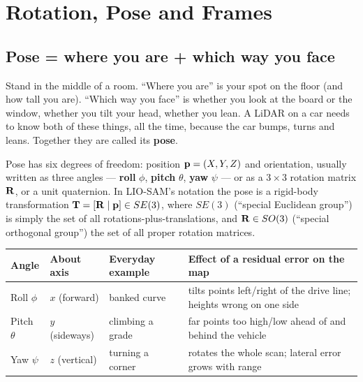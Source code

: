 \chapter{Rotation, Pose and Frames}

\section{Pose = where you are + which way you face}
\begin{kid}
Stand in the middle of a room. ``Where you are'' is your spot on the floor (and how tall you are). ``Which way you face'' is whether you look at the board or the window, whether you tilt your head, whether you lean. A LiDAR on a car needs to know both of these things, all the time, because the car bumps, turns and leans. Together they are called its \textbf{pose}.
\end{kid}

\begin{eng}
Pose has six degrees of freedom: position $\mathbf{p}=(X,Y,Z)$ and orientation, usually written as three angles --- \textbf{roll} $\phi$, \textbf{pitch} $\theta$, \textbf{yaw} $\psi$ --- or as a $3\times3$ rotation matrix $\mathbf{R}$, or a unit quaternion. In LIO-SAM's notation the pose is a rigid-body transformation $\mathbf{T}=[\mathbf{R}\mid\mathbf{p}]\in SE(3)$, where $SE(3)$ (``special Euclidean group'') is simply the set of all rotations-plus-translations, and $\mathbf{R}\in SO(3)$ (``special orthogonal group'') the set of all proper rotation matrices.
\end{eng}


\begin{center}\small
\renewcommand{\arraystretch}{1.2}
\begin{tabularx}{\linewidth}{lllX}\toprule
\textbf{Angle} & \textbf{About axis} & \textbf{Everyday example} & \textbf{Effect of a residual error on the map}\\\midrule
Roll $\phi$ & $x$ (forward) & banked curve & tilts points left/right of the drive line; heights wrong on one side\\
Pitch $\theta$ & $y$ (sideways) & climbing a grade & far points too high/low ahead of and behind the vehicle\\
Yaw $\psi$ & $z$ (vertical) & turning a corner & rotates the whole scan; lateral error grows with range\\\bottomrule
\end{tabularx}\end{center}

